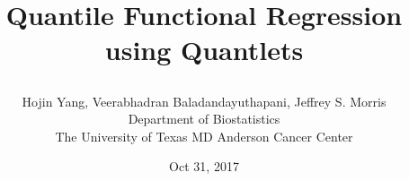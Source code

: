 \documentclass[11pt]{article}
\begin{document}
\title{{\Large  Quantile Functional Regression using Quantlets}
\author{Hojin Yang, Veerabhadran Baladandayuthapani,  Jeffrey S. Morris \\
Department of Biostatistics\\ 
 The University of Texas MD Anderson Cancer Center%
 }
 } 
\date{Oct 31, 2017} 
\maketitle

\mbox{}
\vspace*{-0.4 in}



\end{document}

